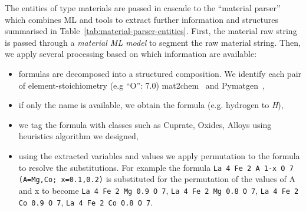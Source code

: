 \documentclass{article}
\begin{document}
The entities of type materials are passed in cascade to the ``material parser'' which combines ML and tools to extract further information and structures summarised in Table~\ref{tab:material-parser-entities}. 
First, the material raw string is passed through a \textit{material ML model} to segment the raw material string. 
Then, we apply several processing based on which information are available: 
\begin{itemize}
    \item formulas are decomposed into a structured composition. We identify each pair of element-stoichiometry (e.g ``O'': 7.0) mat2chem~\cite{kononova_text-mined_2019} and Pymatgen~\cite{Ong2013}, 
    \item if only the name is available, we obtain the formula (e.g. hydrogen to \textit{H}), 
    \item we tag the formula with classes such as Cuprate, Oxides, Alloys using heuristics algorithm we designed, 
    \item using the extracted variables and values we apply permutation to the  formula to resolve the substitutions. For example the formula \texttt{La 4 Fe 2 A 1-x O 7 (A=Mg,Co; x=0.1,0.2)} is substituted for the permutation of the values of A and x to become \texttt{La 4 Fe 2 Mg 0.9 O 7}, \texttt{La 4 Fe 2 Mg 0.8 O 7}, \texttt{La 4 Fe 2 Co 0.9 O 7}, \texttt{La 4 Fe 2 Co 0.8 O 7}.
\end{itemize}

\begin{table}[ht]
\centering
{}
\caption{\label{tab:material-parser-entities} Synthesis of the material parser entities. }
\end{table}
\end{document}

